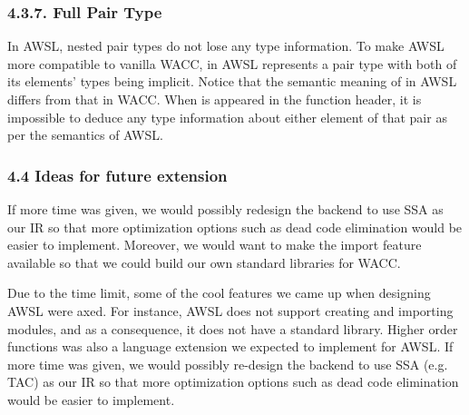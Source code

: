 \documentclass[10pt,a4paper]{report}
\begin{document}
  \subsubsection*{4.3.7. Full Pair Type}
  In AWSL, nested pair types do not lose any type information. To make AWSL more
  compatible to vanilla WACC,  in AWSL represents a pair type with
  both of its elements' types being implicit. Notice that the semantic meaning of
   in AWSL differs from that in WACC. When  is
  appeared in the function header, it is impossible to deduce any type
  information about either element of that pair as per the semantics of AWSL.

  \subsubsection*{4.4 Ideas for future extension}
  If more time was given, we would possibly redesign the backend to use SSA as
  our IR so that more optimization options such as dead code elimination would
  be easier to implement. Moreover, we would want to make the import feature
  available so that we could build our own standard libraries for WACC.

  Due to the time limit, some of the cool features we came up when designing
  AWSL were axed. For instance, AWSL does not support creating and importing
  modules, and as a consequence, it does not have a standard library. Higher
  order functions was also a language extension we expected to implement for
  AWSL. If more time was given, we would possibly re-design the backend to use
  SSA (e.g. TAC) as our IR so that more optimization options such as dead code
  elimination would be easier to implement.
  
\end{document}
